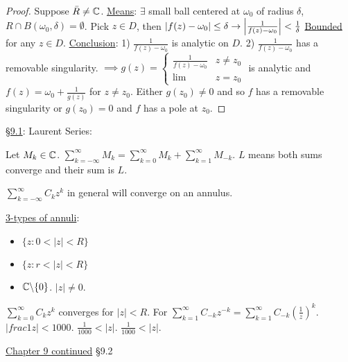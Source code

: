 \documentclass[]{article}
\begin{document}
\begin{proof}
	Suppose $\bar{R} \neq \mathbb{C}$. \underline{Means}: $\exists$ small ball centered at $\omega_0$ of radius $\delta$, $R\cap B(\omega_0,\delta) = \emptyset$. Pick $z\in D$, then $|f(z) - \omega_0| \leq \delta \rightarrow \left| \frac{1}{f(z)-\omega_0} \right| < \frac{1}{\delta}$ \underline{Bounded} for any $z\in D$. \underline{Conclusion}: 1) $\frac{1}{f(z)-\omega_0}$ is analytic on $D$. 2) $\frac{1}{f(z)-\omega_0}$ has a removable singularity. $\implies g(z) = \begin{cases} \frac{1}{f(z) - \omega_0} & z\neq z_0 \\ \lim & z = z_0 \end{cases}$ is analytic and $f(z) = \omega_0 + \frac{1}{g(z)}$ for $z\neq z_0$. Either $g(z_0) \neq 0$ and so $f$ has a removable singularity or $g(z_0) = 0$ and $f$ has a pole at $z_0$.
\end{proof}

\underline{\S9.1}: Laurent Series:

Let $M_k\in \mathbb{C}$. $\sum_{k=-\infty}^\infty M_k = \sum_{k=0}^\infty M_k + \sum_{k=1}^\infty M_{-k}$. $L$ means both sums converge and their sum is $L$.

$\sum_{k=-\infty}^\infty C_k z^k$ in general will converge on an annulus.

\underline{3-types of annuli}:
\begin{itemize}
	\item $\{z: 0<|z|< R\}$
	\item $\{z: r<|z|<R\}$
	\item $\mathbb{C}\backslash \{0\}$. $|z|\neq 0$.
\end{itemize}

$\sum_{k=0}^\infty C_k z^k$ converges for $|z|<R$. For $\sum_{k=1}^\infty C_{-k} z^{-k} = \sum_{k=1}^\infty C_{-k} (\frac{1}{z})^k$. $|frac{1}{z}| < 1000$. $\frac{1}{1000}<|z|$. $\frac{1}{1000} < |z|$.

\ul{Chapter 9 continued} \S9.2
\end{document}
